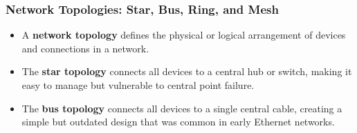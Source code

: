 \documentclass{beamer}
\begin{document}
\begin{frame}
    \frametitle{Network Topologies: Star, Bus, Ring, and Mesh}
    
    \begin{itemize}
        \item A \textbf{network topology} defines the physical or logical arrangement of devices and connections in a network.
        
        \item The \textbf{star topology} connects all devices to a central hub or switch, making it easy to manage but vulnerable to central point failure.
        
        \item The \textbf{bus topology} connects all devices to a single central cable, creating a simple but outdated design that was common in early Ethernet networks.
        
    \end{itemize}
\end{frame}
\end{document}
